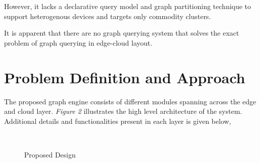 \documentclass[conference]{IEEEtran}
\begin{document}
However, it lacks a declarative query model and graph partitioning technique to support heterogenous devices and targets only commodity clusters.

It is apparent that there are no graph querying system that solves the exact problem of graph querying in edge-cloud layout. 

\section{Problem Definition and Approach}

The proposed graph engine consists of different modules spanning across the edge and cloud layer. \emph{Figure 2} illustrates the high level architecture of the system. Additional details and functionalities present in each layer is given below,

\begin{figure}[th]
	\centering%
	\qquad
	\\
	\label{fig:problem-approach}
	\caption{Proposed Design}
	\vspace{-0.1in}
\end{figure} 
\end{document}
